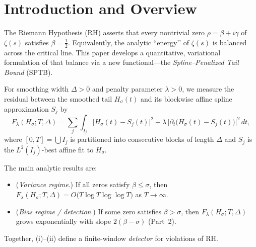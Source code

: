 
\section{Introduction and Overview}

The Riemann Hypothesis (RH) asserts that every nontrivial zero 
$\rho = \beta + i\gamma$ of $\zeta(s)$ satisfies $\beta = \tfrac12$.
Equivalently, the analytic “energy’’ of $\zeta(s)$ is balanced across the
critical line.  This paper develops a quantitative, variational formulation
of that balance via a new functional—the
\emph{Spline–Penalized Tail Bound} (SPTB).  

For smoothing width $\Delta>0$ and penalty parameter $\lambda>0$, we measure
the residual between the smoothed tail $H_\sigma(t)$ and its blockwise affine spline
approximation $S_j$ by
\begin{equation}
F_\lambda(H_\sigma;T,\Delta)
  = \sum_{j}\!\int_{I_j}
       \bigl|H_\sigma(t)-S_j(t)\bigr|^2
       + \lambda\,\bigl|\partial_t\!\bigl(H_\sigma(t)-S_j(t)\bigr)\bigr|^2\,dt,
\label{eq:SPTB}
\tag{1.1}
\end{equation}
where $[0,T] = \bigcup I_j$ is partitioned into consecutive blocks of length $\Delta$ and
$S_j$ is the $L^2(I_j)$-best affine fit to $H_\sigma$.

The main analytic results are:
\begin{itemize}
\item[(i)] (\emph{Variance regime}.) If all zeros satisfy $\beta\le\sigma$, then
$F_\lambda(H_\sigma;T,\Delta)=O\!\bigl(T\log T\log\log T\bigr)$ as $T\to\infty$.
\item[(ii)] (\emph{Bias regime / detection}.) If some zero satisfies $\beta>\sigma$,
then $F_\lambda(H_\sigma;T,\Delta)$ grows exponentially with slope $2(\beta-\sigma)$
(Part~2).
\end{itemize}
Together, (i)–(ii) define a finite-window \emph{detector} for violations of RH.

